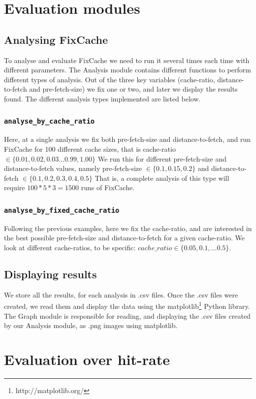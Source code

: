 \documentclass[12pt,twoside,notitlepage]{report}
\newcommand{\fxch}{FixCache}
\begin{document}
\section{Evaluation modules}
\subsection{Analysing \fxch{}}
To analyse and evaluate \fxch{} we need to run it several times each time with different parameters. The Analysis module contains different functions to perform different types of analysis. Out of the three key variables (cache-ratio, distance-to-fetch and pre-fetch-size) we fix one or two, and later we display the results found. The different analysis types implemented are listed below.
\subsubsection{\texttt{analyse\_by\_cache\_ratio}}Here, at a single analysis we fix both pre-fetch-size and distance-to-fetch, and run \fxch{} for 100 different cache sizes, that is cache-ratio $\in \{0.01, 0.02, 0.03 \dots 0.99, 1.00\}$ We run this for different pre-fetch-size and distance-to-fetch values, namely pre-fetch-size $\in \{0.1, 0.15, 0.2\}$ and distance-to-fetch $\in \{0.1, 0.2, 0.3, 0.4, 0.5\}$ That is, a complete analysis of this type will require $100*5*3=1500$ runs of \fxch{}.
\subsubsection{\texttt{analyse\_by\_fixed\_cache\_ratio}} 
Following the previous examples, here we fix the cache-ratio, and are interested in the best possible pre-fetch-size and distance-to-fetch for a given cache-ratio. We look at different cache-ratios, to be specific: $cache\_ratio \in \{0.05, 0.1, \dots 0.5\}$. 
\subsection{Displaying results}
We store all the results, for each analysis in .csv files. Once the .csv files were created, we read them and display the data using the matplotlib\footnote{http://matplotlib.org/} Python library. The Graph module is responsible for reading, and displaying the .csv files created by our Analysis module, as .png images using matplotlib.
\section{Evaluation over hit-rate}
\end{document}
